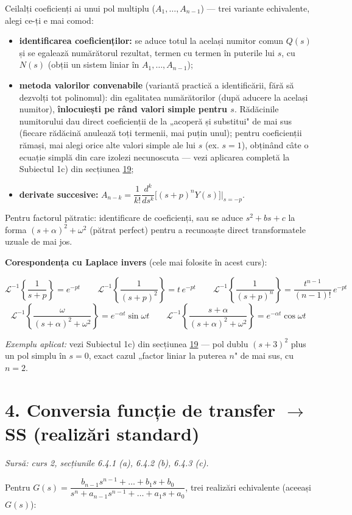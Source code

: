 \documentclass[10pt,a4paper]{article}
\newcommand{\srcnote}[1]{{\footnotesize\color{gray!55!black}\textit{Sursă: #1}}\par}
\begin{document}
Ceilalți coeficienți ai unui pol multiplu ($A_1,\dots,A_{n-1}$) — trei variante echivalente, alegi ce-ți e mai comod:
\begin{itemize}
\item \textbf{identificarea coeficienților:} se aduce totul la același numitor comun $Q(s)$ și se egalează numărătorul rezultat, termen cu termen în puterile lui $s$, cu $N(s)$ (obții un sistem liniar în $A_1,\dots,A_{n-1}$);
\item \textbf{metoda valorilor convenabile} (variantă practică a identificării, fără să dezvolți tot polinomul): din egalitatea numărătorilor (după aducere la același numitor), \textbf{înlocuiești pe rând valori simple pentru $s$}. Rădăcinile numitorului dau direct coeficienții de la „acoperă și substitui" de mai sus (fiecare rădăcină anulează toți termenii, mai puțin unul); pentru coeficienții rămași, mai alegi orice alte valori simple ale lui $s$ (ex. $s{=}1$), obținând câte o ecuație simplă din care izolezi necunoscuta — vezi aplicarea completă la Subiectul 1c) din secțiunea \hyperref[sec:19]{19};
\item \textbf{derivate succesive:} $A_{n-k}=\dfrac1{k!}\dfrac{d^k}{ds^k}\big[(s+p)^nY(s)\big]\Big|_{s=-p}$.
\end{itemize}
Pentru factorul pătratic: identificare de coeficienți, sau se aduce $s^2{+}bs{+}c$ la forma $(s+\alpha)^2+\omega^2$ (pătrat perfect) pentru a recunoaște direct transformatele uzuale de mai jos.

\textbf{Corespondența cu Laplace invers} (cele mai folosite în acest curs):
\begin{keyeq}\color{red!65!black}
$$\mathcal L^{-1}\left\{\dfrac1{s+p}\right\}=e^{-pt}\qquad \mathcal L^{-1}\left\{\dfrac1{(s+p)^2}\right\}=t\,e^{-pt}\qquad \mathcal L^{-1}\left\{\dfrac1{(s+p)^n}\right\}=\dfrac{t^{n-1}}{(n-1)!}\,e^{-pt}$$
$$\mathcal L^{-1}\left\{\dfrac{\omega}{(s+\alpha)^2+\omega^2}\right\}=e^{-\alpha t}\sin\omega t\qquad \mathcal L^{-1}\left\{\dfrac{s+\alpha}{(s+\alpha)^2+\omega^2}\right\}=e^{-\alpha t}\cos\omega t$$
\end{keyeq}
\textit{Exemplu aplicat:} vezi Subiectul 1c) din secțiunea \hyperref[sec:19]{19} — pol dublu $(s+3)^2$ plus un pol simplu în $s{=}0$, exact cazul „factor liniar la puterea $n$" de mai sus, cu $n{=}2$.

\section*{4. Conversia funcție de transfer $\to$ SS (realizări standard)}\label{sec:4}
\srcnote{curs 2, secțiunile 6.4.1 (a), 6.4.2 (b), 6.4.3 (c).}
Pentru $G(s)=\dfrac{b_{n-1}s^{n-1}+\dots+b_1s+b_0}{s^n+a_{n-1}s^{n-1}+\dots+a_1s+a_0}$, trei realizări echivalente (aceeași $G(s)$):
\end{document}
